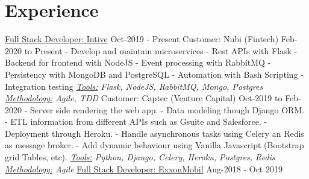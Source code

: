 \documentclass[letterpaper]{twentysecondcv} %
\begin{document}
\section{Experience}
\newline\newline 
{\large\underline{Full Stack Developer: Intive}}  \hspace*{105pt}  Oct-2019 - Present
\newline\newline
Customer: Nubi (Fintech) \hspace*{145pt} Feb-2020 to Present
    \newline- Develop and maintain microservices
    \newline- Rest APIs with Flask
    \newline- Backend for frontend with NodeJS
    \newline- Event processing with RabbitMQ
    \newline- Persistency with MongoDB and PostgreSQL
    \newline- Automation with Bash Scripting
    \newline- Integration testing
    \newline\newline\textit{\underline{Tools:} Flask, NodeJS, RabbitMQ, Mongo, Postgres \underline{Methodology:} Agile, TDD}
    \newline\newline
Customer: Captec (Venture Capital) \hspace*{85pt} Oct-2019 to Feb-2020
    \newline- Server side rendering the web app.
    \newline- Data modeling though Django ORM.
    \newline- ETL information from different APIs such as Gsuite and Salesforce.
    \newline- Deployment through Heroku.
    \newline- Handle asynchronous tasks using Celery an Redis as message broker.
    \newline- Add dynamic behaviour using Vanilla Javascript (Bootstrap grid Tables, etc).
    \newline\newline\textit{\underline{Tools:} Python, Django, Celery, Heroku, Postgres, Redis \underline{Methodology:} Agile}
    \newline\newline
{\large\underline{Full Stack Developer: ExxonMobil}}  \hspace*{70pt}  Aug-2018 - Oct 2019
\end{document}
